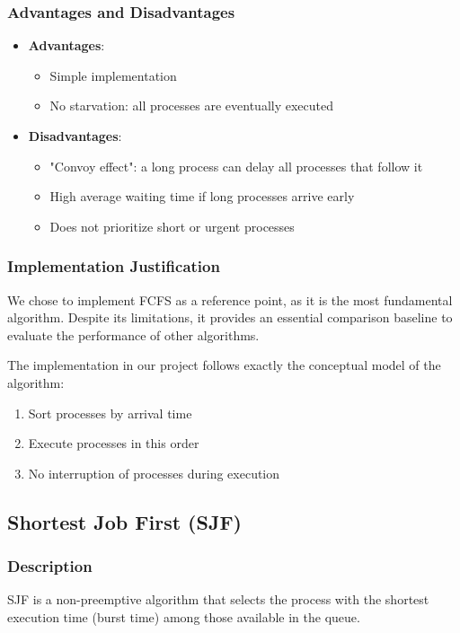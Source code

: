 \documentclass[12pt,a4paper]{article}
\begin{document}
\subsubsection{Advantages and Disadvantages}
\begin{itemize}
    \item \textbf{Advantages}:
    \begin{itemize}
        \item Simple implementation
        \item No starvation: all processes are eventually executed
    \end{itemize}
    \item \textbf{Disadvantages}:
    \begin{itemize}
        \item "Convoy effect": a long process can delay all processes that follow it
        \item High average waiting time if long processes arrive early
        \item Does not prioritize short or urgent processes
    \end{itemize}
\end{itemize}

\subsubsection{Implementation Justification}
We chose to implement FCFS as a reference point, as it is the most fundamental algorithm. Despite its limitations, it provides an essential comparison baseline to evaluate the performance of other algorithms.

The implementation in our project follows exactly the conceptual model of the algorithm:
\begin{enumerate}
    \item Sort processes by arrival time
    \item Execute processes in this order
    \item No interruption of processes during execution
\end{enumerate}

\subsection{Shortest Job First (SJF)}
\subsubsection{Description}
SJF is a non-preemptive algorithm that selects the process with the shortest execution time (burst time) among those available in the queue.
\end{document}
